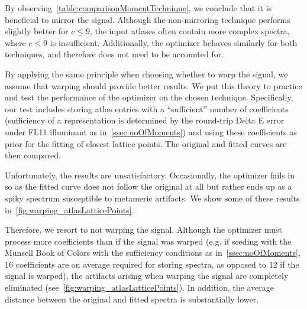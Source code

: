 By observing~\cref{table:comparisonMomentTechnique}, we conclude that it is beneficial to mirror the signal. Although the non-mirroring technique performs slightly better for $c \le 9$, the input atlases often contain more complex spectra, where $c \le 9$ is insufficient. Additionally, the optimizer behaves similarly for both techniques, and therefore does not need to be accounted for.

By applying the same principle when choosing whether to warp the signal, we assume that warping should provide better results. We put this theory to practice and test the performance of the optimizer on the chosen technique. Specifically, our test includes storing atlas entries with a ``sufficient'' number of coefficients (sufficiency of a representation is determined by the round-trip Delta E error under FL11 illuminant as in~\cref{ssec:noOfMoments}) and using these coefficients as prior for the fitting of closest lattice points. The original and fitted curves are then compared.

Unfortunately, the results are unsatisfactory. Occasionally, the optimizer fails in so as the fitted curve does not follow the original at all but rather ends up as a spiky spectrum susceptible to metameric artifacts. We show some of these results in~\cref{fig:warping_atlasLatticePoints}.

Therefore, we resort to not warping the signal. Although the optimizer must process more coefficients than if the signal was warped (e.g. if seeding with the Munsell Book of Colors with the sufficiency conditions as in~\cref{ssec:noOfMoments}, $16$ coefficients are on average required for storing spectra, as opposed to $12$ if the signal is warped), the artifacts arising when warping the signal are completely eliminated (see~\cref{fig:warping_atlasLatticePoints}). In addition, the average distance between the original and fitted spectra is substantially lower.

